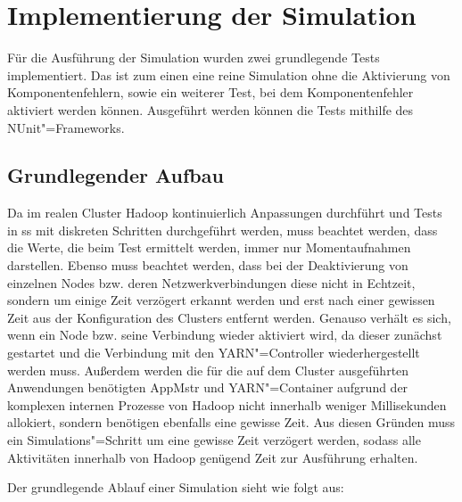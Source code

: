 \section{Implementierung der Simulation}
\label{sec:implSimulation}

Für die Ausführung der Simulation wurden zwei grundlegende Tests implementiert.
Das ist zum einen eine reine Simulation ohne die Aktivierung von Komponentenfehlern, sowie ein weiterer Test, bei dem Komponentenfehler aktiviert werden können.
Ausgeführt werden können die Tests mithilfe des NUnit"=Frameworks.

\subsection{Grundlegender Aufbau}
\label{subsec:simulationBasics}

Da im realen Cluster Hadoop kontinuierlich Anpassungen durchführt und Tests in \ac{ss} mit diskreten Schritten durchgeführt werden, muss beachtet werden, dass die Werte, die beim Test ermittelt werden, immer nur Momentaufnahmen darstellen.
Ebenso muss beachtet werden, dass bei der Deaktivierung von einzelnen Nodes bzw. deren Netzwerkverbindungen diese nicht in Echtzeit, sondern um einige Zeit verzögert erkannt werden und erst nach einer gewissen Zeit aus der Konfiguration des Clusters entfernt werden.
Genauso verhält es sich, wenn ein Node bzw. seine Verbindung wieder aktiviert wird, da dieser zunächst gestartet und die Verbindung mit den YARN"=Controller wiederhergestellt werden muss.
Außerdem werden die für die auf dem Cluster ausgeführten Anwendungen benötigten \ac{AppMstr} und YARN"=Container aufgrund der komplexen internen Prozesse von Hadoop nicht innerhalb weniger Millisekunden allokiert, sondern benötigen ebenfalls eine gewisse Zeit.
Aus diesen Gründen muss ein Simulations"=Schritt um eine gewisse Zeit verzögert werden, sodass alle Aktivitäten innerhalb von Hadoop genügend Zeit zur Ausführung erhalten.

Der grundlegende Ablauf einer Simulation sieht wie folgt aus:

